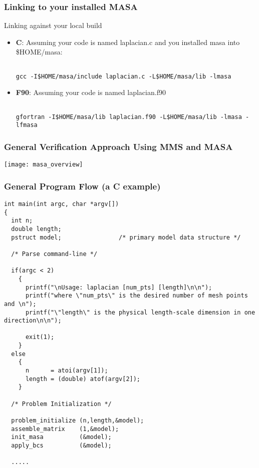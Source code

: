 \documentclass[mathserif]{beamer}
\begin{document}
\begin{frame}[fragile]
  \frametitle{Linking to your installed MASA}
  \begin{block}{Linking against your local build}
    \begin{itemize} 

      \item {\bf C}: Assuming your code is named laplacian.c and you
      installed masa into \$HOME/masa: 
{\tiny
\begin{verbatim}

gcc -I$HOME/masa/include laplacian.c -L$HOME/masa/lib -lmasa

\end{verbatim}
}
      
      \item {\bf F90}: Assuming your code is named laplacian.f90 
{\tiny
\begin{verbatim}

gfortran -I$HOME/masa/lib laplacian.f90 -L$HOME/masa/lib -lmasa -lfmasa

\end{verbatim}
}
      \end{itemize}
    \end{block}
\end{frame}

\begin{frame}
  \frametitle{General Verification Approach Using MMS and MASA}
  \begin{center}
    \texttt{[image: masa\_overview]} \\
  \end{center}
\end{frame}


\begin{frame}[fragile]
  \frametitle{General Program Flow (a C example)}
{\tiny
  \begin{verbatim}
int main(int argc, char *argv[])
{
  int n;
  double length;
  pstruct model;                /* primary model data structure */

  /* Parse command-line */

  if(argc < 2)
    {
      printf("\nUsage: laplacian [num_pts] [length]\n\n");
      printf("where \"num_pts\" is the desired number of mesh points and \n");
      printf("\"length\" is the physical length-scale dimension in one direction\n\n");
      
      exit(1);
    }
  else
    {
      n      = atoi(argv[1]);
      length = (double) atof(argv[2]);
    }

  /* Problem Initialization */

  problem_initialize (n,length,&model);
  assemble_matrix    (1,&model);
  init_masa          (&model);
  apply_bcs          (&model);

  .....
\end{verbatim}
}  
\end{frame}
\end{document}
